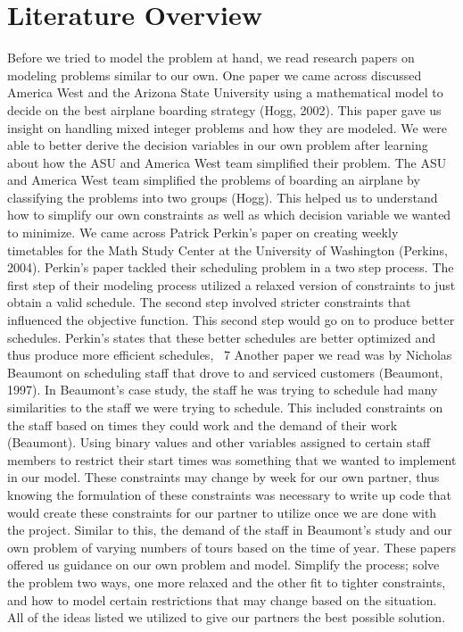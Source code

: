 \documentclass[12pt]{article}
\begin{document}
\section*{Literature Overview}
Before we tried to model the problem at hand, we read research papers on
modeling problems similar to our own. One paper we came across discussed America 
West and the Arizona State University using a mathematical model to decide on the best 
airplane boarding strategy (Hogg, 2002). This paper gave us insight on handling mixed integer 
problems and how they are modeled. We were able to better derive the decision variables 
in our own problem after learning about how the ASU and America West team simplified 
their problem. The ASU and America West team simplified the problems of boarding an 
airplane by classifying the problems into two groups (Hogg). This helped us to 
understand how to simplify our own constraints as well as which decision variable we 
wanted to minimize.
We came across Patrick Perkin’s paper on creating weekly timetables for the 
Math Study Center at the University of Washington (Perkins, 2004). Perkin’s paper tackled 
their scheduling problem in a two step process. The first step of their modeling process 
utilized a relaxed version of constraints to just obtain a valid schedule. The second step 
involved stricter constraints that influenced the objective function. This second step 
would go on to produce better schedules. Perkin’s states that these better schedules are 
better optimized and thus produce more efficient schedules, ~7%
Another paper we read was by Nicholas Beaumont on scheduling staff that drove 
to and serviced customers (Beaumont, 1997). In Beaumont’s case study, the staff he was trying 
to schedule had many similarities to the staff we were trying to schedule. This included 
constraints on the staff based on times they could work and the demand of their work 
(Beaumont). Using binary values and other variables assigned to certain staff members to 
restrict their start times was something that we wanted to implement in our model. These 
constraints may change by week for our own partner, thus knowing the formulation of 
these constraints was necessary to write up code that would create these constraints for 
our partner to utilize once we are done with the project. Similar to this, the demand of the 
staff in Beaumont’s study and our own problem of varying numbers of tours based on the 
time of year. 
These papers offered us guidance on our own problem and model. Simplify the 
process; solve the problem two ways, one more relaxed and the other fit to tighter 
constraints, and how to model certain restrictions that may change based on the situation. 
All of the ideas listed we utilized to give our partners the best possible solution.
\end{document}
